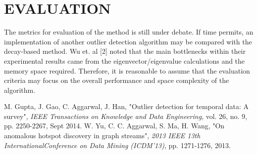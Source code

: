 \documentclass[letterpaper, 10 pt, conference]{ieeeconf}  %
\begin{document}
\section{EVALUATION}
\par The metrics for evaluation of the method is still under debate. If time permits, an implementation of another outlier detection algorithm may be compared with the decay-based method. Wu et. al [2] noted that the main bottlenecks within their experimental results came from the eigenvector/eigenvalue calculations and the memory space required. Therefore, it is reasonable to assume that the evaluation criteria may focus on the overall performance and space complexity of the algorithm.

\begin{thebibliography}{2}
 M. Gupta, J. Gao, C. Aggarwal, J. Han, "Outlier detection for temporal data: A survey", \textit{IEEE Transactions on Knowledge and Data Engineering}, vol. 26, no. 9, pp. 2250-2267, Sept 2014.
 W. Yu, C. C. Aggarwal, S. Ma, H. Wang, "On anomalous hotspot discovery in graph streams", \textit{2013 IEEE 13th InternationalConference on Data Mining (ICDM'13)}, pp. 1271-1276, 2013.
\end{thebibliography}
\end{document}
